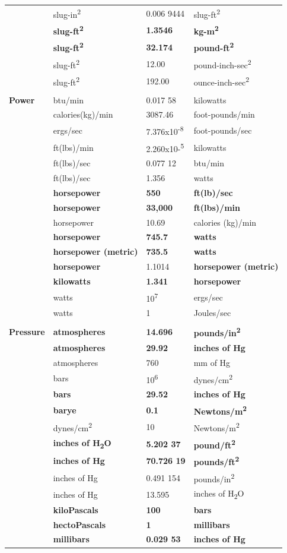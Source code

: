 \documentclass[
]{book}
\begin{document}
\begin{longtable}[]{@{}llll@{}}
& slug-in\textsuperscript{2} & 0.006 9444 & slug-ft\textsuperscript{2}\tabularnewline
& \textbf{slug-ft\textsuperscript{2}} & \textbf{1.3546} & \textbf{kg-m\textsuperscript{2}}\tabularnewline
& \textbf{slug-ft\textsuperscript{2}} & \textbf{32.174} & \textbf{pound-ft\textsuperscript{2}}\tabularnewline
& slug-ft\textsuperscript{2} & 12.00 & pound-inch-sec\textsuperscript{2}\tabularnewline
& slug-ft\textsuperscript{2} & 192.00 & ounce-inch-sec\textsuperscript{2}\tabularnewline
& & &\tabularnewline
\textbf{Power} & btu/min & 0.017 58 & kilowatts\tabularnewline
& calories(kg)/min & 3087.46 & foot-pounds/min\tabularnewline
& ergs/sec & 7.376x10\textsuperscript{-8} & foot-pounds/sec\tabularnewline
& ft(lbs)/min & 2.260x10-\textsuperscript{5} & kilowatts\tabularnewline
& ft(lbs)/sec & 0.077 12 & btu/min\tabularnewline
& ft(lbs)/sec & 1.356 & watts\tabularnewline
& \textbf{horsepower} & \textbf{550} & \textbf{ft(lb)/sec}\tabularnewline
& \textbf{horsepower} & \textbf{33,000} & \textbf{ft(lbs)/min}\tabularnewline
& horsepower & 10.69 & calories (kg)/min\tabularnewline
& \textbf{horsepower} & \textbf{745.7} & \textbf{watts }\tabularnewline
& \textbf{horsepower (metric)} & \textbf{735.5} & \textbf{watts}\tabularnewline
& \textbf{horsepower} & 1.1014 & \textbf{horsepower (metric)}\tabularnewline
& \textbf{kilowatts} & \textbf{1.341} & \textbf{horsepower}\tabularnewline
& watts & 10\textsuperscript{7} & ergs/sec\tabularnewline
& watts & 1 & Joules/sec\tabularnewline
& & &\tabularnewline
\textbf{Pressure} & \textbf{atmospheres} & \textbf{14.696} & \textbf{pounds/in\textsuperscript{2}}\tabularnewline
& \textbf{atmospheres} & \textbf{29.92} & \textbf{inches of Hg}\tabularnewline
& atmospheres & 760 & mm of Hg\tabularnewline
& bars & 10\textsuperscript{6} & dynes/cm\textsuperscript{2}\tabularnewline
& \textbf{bars} & \textbf{29.52} & \textbf{inches of Hg}\tabularnewline
& \textbf{barye} & \textbf{0.1} & \textbf{Newtons/m\textsuperscript{2}}\tabularnewline
& dynes/cm\textsuperscript{2} & 10 & Newtons/m\textsuperscript{2}\tabularnewline
& \textbf{inches of H\textsubscript{2}O} & \textbf{5.202 37} & \textbf{pound/ft\textsuperscript{2}}\tabularnewline
& \textbf{inches of Hg} & \textbf{70.726 19} & \textbf{pounds/ft\textsuperscript{2}}\tabularnewline
& inches of Hg & 0.491 154 & pounds/in\textsuperscript{2}\tabularnewline
& inches of Hg & 13.595 & inches of H\textsubscript{2}O\tabularnewline
& \textbf{kiloPascals} & \textbf{100} & \textbf{bars}\tabularnewline
& \textbf{hectoPascals} & \textbf{1} & \textbf{millibars}\tabularnewline
& \textbf{millibars} & \textbf{0.029 53} & \textbf{inches of Hg}\tabularnewline

\end{longtable}
\end{document}
